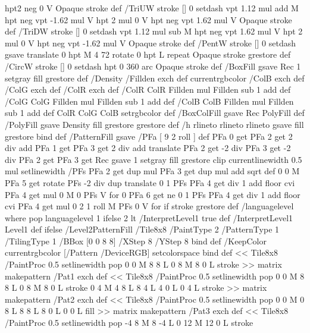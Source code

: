 {{{  hpt2 neg 0 V Opaque stroke} def
/TriUW {stroke [] 0 setdash vpt 1.12 mul add M
  hpt neg vpt -1.62 mul V
  hpt 2 mul 0 V
  hpt neg vpt 1.62 mul V Opaque stroke} def
/TriDW {stroke [] 0 setdash vpt 1.12 mul sub M
  hpt neg vpt 1.62 mul V
  hpt 2 mul 0 V
  hpt neg vpt -1.62 mul V Opaque stroke} def
/PentW {stroke [] 0 setdash gsave
  translate 0 hpt M 4 {72 rotate 0 hpt L} repeat
  Opaque stroke grestore} def
/CircW {stroke [] 0 setdash 
  hpt 0 360 arc Opaque stroke} def
/BoxFill {gsave Rec 1 setgray fill grestore} def
/Density {
  /Fillden exch def
  currentrgbcolor
  /ColB exch def /ColG exch def /ColR exch def
  /ColR ColR Fillden mul Fillden sub 1 add def
  /ColG ColG Fillden mul Fillden sub 1 add def
  /ColB ColB Fillden mul Fillden sub 1 add def
  ColR ColG ColB setrgbcolor} def
/BoxColFill {gsave Rec PolyFill} def
/PolyFill {gsave Density fill grestore grestore} def
/h {rlineto rlineto rlineto gsave fill grestore} bind def
%
%
/PatternFill {gsave /PFa [ 9 2 roll ] def
  PFa 0 get PFa 2 get 2 div add PFa 1 get PFa 3 get 2 div add translate
  PFa 2 get -2 div PFa 3 get -2 div PFa 2 get PFa 3 get Rec
  gsave 1 setgray fill grestore clip
  currentlinewidth 0.5 mul setlinewidth
  /PFs PFa 2 get dup mul PFa 3 get dup mul add sqrt def
  0 0 M PFa 5 get rotate PFs -2 div dup translate
  0 1 PFs PFa 4 get div 1 add floor cvi
	{PFa 4 get mul 0 M 0 PFs V} for
  0 PFa 6 get ne {
	0 1 PFs PFa 4 get div 1 add floor cvi
	{PFa 4 get mul 0 2 1 roll M PFs 0 V} for
 } if
  stroke grestore} def
%
/languagelevel where
 {pop languagelevel} {1} ifelse
 2 lt
	{/InterpretLevel1 true def}
	{/InterpretLevel1 Level1 def}
 ifelse
%
%
/Level2PatternFill {
/Tile8x8 {/PaintType 2 /PatternType 1 /TilingType 1 /BBox [0 0 8 8] /XStep 8 /YStep 8}
	bind def
/KeepColor {currentrgbcolor [/Pattern /DeviceRGB] setcolorspace} bind def
<< Tile8x8
 /PaintProc {0.5 setlinewidth pop 0 0 M 8 8 L 0 8 M 8 0 L stroke} 
>> matrix makepattern
/Pat1 exch def
<< Tile8x8
 /PaintProc {0.5 setlinewidth pop 0 0 M 8 8 L 0 8 M 8 0 L stroke
	0 4 M 4 8 L 8 4 L 4 0 L 0 4 L stroke}
>> matrix makepattern
/Pat2 exch def
<< Tile8x8
 /PaintProc {0.5 setlinewidth pop 0 0 M 0 8 L
	8 8 L 8 0 L 0 0 L fill}
>> matrix makepattern
/Pat3 exch def
<< Tile8x8
 /PaintProc {0.5 setlinewidth pop -4 8 M 8 -4 L
	0 12 M 12 0 L stroke}
}}}
